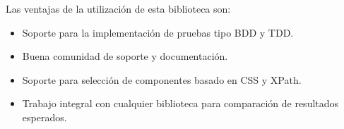 Las ventajas de la utilización de esta biblioteca son:

\begin{itemize}
\item Soporte para la implementación de pruebas tipo BDD y TDD.
\item Buena comunidad de soporte y documentación.
\item Soporte para selección de componentes basado en CSS y XPath.
\item Trabajo integral  con cualquier biblioteca para comparación de
    resultados esperados.
\end{itemize}

